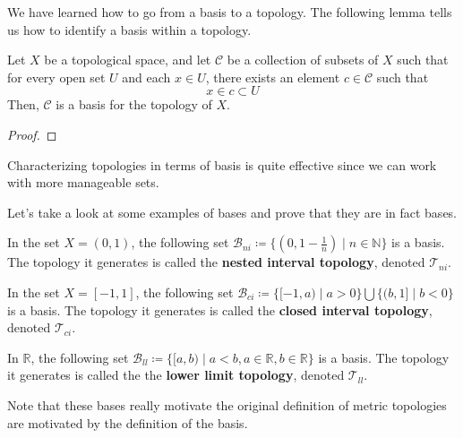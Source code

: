 \documentclass{article}
\begin{document}
    We have learned how to go from a basis to a topology. The following lemma tells us how to identify a basis within a topology. 

    \begin{theorem}
      Let $X$ be a topological space, and let $\mathcal{C}$ be a collection of subsets of $X$ such that for every open set $U$ and each $x \in U$, there exists an element $c \in \mathcal{C}$ such that
      \begin{equation}
        x \in c \subset U
      \end{equation}
      Then, $\mathcal{C}$ is a basis for the topology of $X$. 
    \end{theorem}
    \begin{proof}
      
    \end{proof} 

    Characterizing topologies in terms of basis is quite effective since we can work with more manageable sets. 

    Let's take a look at some examples of bases and prove that they are in fact bases. 

    \begin{theorem}
      In the set $X = (0,1)$, the following set $\mathscr{B}_{ni} \coloneqq \{ (0, 1-\frac{1}{n}) \; | \; n \in \mathbb{N} \}$ is a basis. The topology it generates is called the \textbf{nested interval topology}, denoted $\mathscr{T}_{ni}$. 
    \end{theorem}

    \begin{theorem}[Closed Interval Topology on $[-1, 1\rbrack$]
      In the set $X = [-1, 1]$, the following set $\mathscr{B}_{ci} \coloneqq \{ [-1, a) \; | \; a>0 \big\} \bigcup \big\{ (b, 1] \; | \; b<0 \}$ is a basis. The topology it generates is called the \textbf{closed interval topology}, denoted $\mathscr{T}_{ci}$. 
    \end{theorem}

    \begin{theorem} 
      In $\mathbb{R}$, the following set $\mathscr{B}_{ll} \coloneqq \{ [a, b) \mid a < b, a \in \mathbb{R}, b \in \mathbb{R} \}$ is a basis. The topology it generates is called the the \textbf{lower limit topology}, denoted $\mathscr{T}_{ll}$. 
    \end{theorem} 

    Note that these bases really motivate the original definition of metric topologies are motivated by the definition of the basis.  
\end{document}
